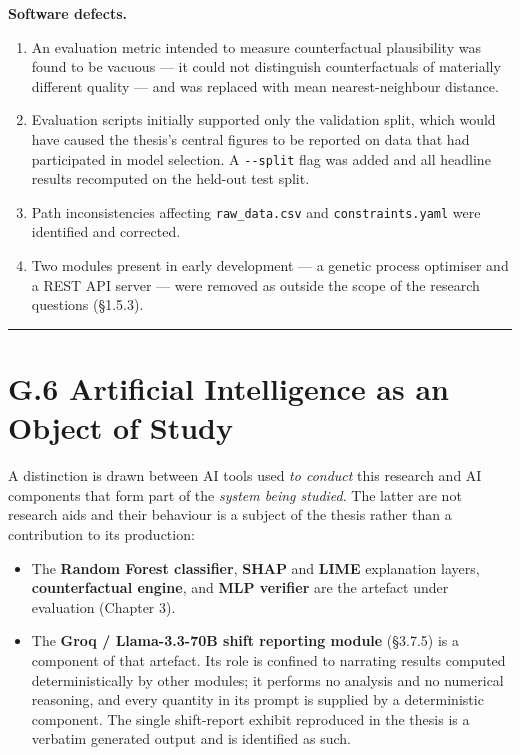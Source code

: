 \textbf{Software defects.}

\begin{enumerate}
\def\labelenumi{\arabic{enumi}.}
\setcounter{enumi}{8}
\tightlist
\item
  An evaluation metric intended to measure counterfactual plausibility was found to be vacuous --- it could not distinguish counterfactuals of materially different quality --- and was replaced with mean nearest-neighbour distance.
\item
  Evaluation scripts initially supported only the validation split, which would have caused the thesis's central figures to be reported on data that had participated in model selection. A \texttt{-\/-split} flag was added and all headline results recomputed on the held-out test split.
\item
  Path inconsistencies affecting \texttt{raw\_data.csv} and \texttt{constraints.yaml} were identified and corrected.
\item
  Two modules present in early development --- a genetic process optimiser and a REST API server --- were removed as outside the scope of the research questions (§1.5.3).
\end{enumerate}

\begin{center}\rule{0.5\linewidth}{0.5pt}\end{center}

\hypertarget{g.6-artificial-intelligence-as-an-object-of-study}{%
\section{G.6 Artificial Intelligence as an Object of Study}\label{g.6-artificial-intelligence-as-an-object-of-study}}

A distinction is drawn between AI tools used \emph{to conduct} this research and AI components that form part of the \emph{system being studied}. The latter are not research aids and their behaviour is a subject of the thesis rather than a contribution to its production:

\begin{itemize}
\tightlist
\item
  The \textbf{Random Forest classifier}, \textbf{SHAP} and \textbf{LIME} explanation layers, \textbf{counterfactual engine}, and \textbf{MLP verifier} are the artefact under evaluation (Chapter 3).
\item
  The \textbf{Groq / Llama-3.3-70B shift reporting module} (§3.7.5) is a component of that artefact. Its role is confined to narrating results computed deterministically by other modules; it performs no analysis and no numerical reasoning, and every quantity in its prompt is supplied by a deterministic component. The single shift-report exhibit reproduced in the thesis is a verbatim generated output and is identified as such.
\end{itemize}

